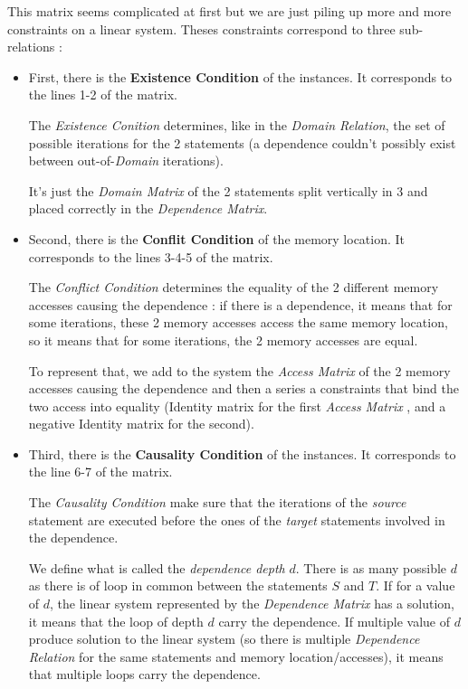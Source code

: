 \documentclass[paper=a4, fontsize=11.5pt]{scrartcl}
\numberwithin{equation}{section}        %
\numberwithin{figure}{section}          %
\numberwithin{table}{section}               %
\begin{document}
        This matrix seems complicated at first but we are just piling up more and more constraints
        on a linear system. Theses constraints correspond to three sub-relations :
        \begin{itemize}
            \item First, there is the \textbf{Existence Condition} of the instances.
                It corresponds to the lines 1-2 of the matrix.

                The \textit{Existence Conition} determines, like in the \textit{Domain Relation},
                the set of possible iterations for the 2 statements (a dependence couldn't
                possibly exist between out-of-\textit{Domain} iterations).

                It's just the \textit{Domain Matrix} of the 2 statements split vertically
                in 3 and placed correctly in the \textit{Dependence Matrix}.
            \item Second, there is the \textbf{Conflit Condition} of the memory location.
                It corresponds to the lines 3-4-5 of the matrix.

                The \textit{Conflict Condition} determines the equality of the 2 different 
                memory accesses causing the dependence : if there is a dependence,
                it means that for some iterations, these 2 memory accesses
                access the same memory location, so it means that for some iterations,
                the 2 memory accesses are equal.

                To represent that, we add to the system the \textit{Access Matrix} of the 2 memory accesses
                causing the dependence and then a series a constraints
                that bind the two access into equality (Identity matrix for the first
                \textit{Access Matrix} , and a negative Identity matrix for the second).
            \item Third, there is the \textbf{Causality Condition} of the instances.
                It corresponds to the line 6-7 of the matrix.

                The \textit{Causality Condition} make sure that the iterations of the
                \textit{source} statement are executed before the ones of the \textit{target} statements
                involved in the dependence.

                We define what is called the \textit{dependence depth} $d$. There is
                as many possible $d$ as there is of loop in common between the statements $S$ and $T$.
                If for a value of $d$, the linear system represented by the \textit{Dependence Matrix}
                has a solution, it means that the loop of depth $d$ carry the dependence.
                If multiple value of $d$ produce solution to the linear system (so there
                is multiple \textit{Dependence Relation} for the same statements and
                memory location/accesses), it means that multiple loops carry the dependence.


\end{itemize}
\end{document}
